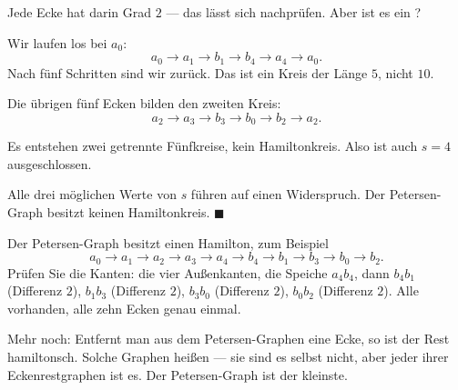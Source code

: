 \begin{merksatz}
Jede Ecke hat darin Grad $2$ --- das lässt sich nachprüfen. Aber ist es ein ?

Wir laufen los bei $a_0$:
\[ a_0 \to a_1 \to b_1 \to b_4 \to a_4 \to a_0 . \]
Nach fünf Schritten sind wir zurück. Das ist ein Kreis der Länge $5$, nicht $10$.

Die übrigen fünf Ecken bilden den zweiten Kreis:
\[ a_2 \to a_3 \to b_3 \to b_0 \to b_2 \to a_2 . \]

\begin{center}
\end{center}

Es entstehen zwei getrennte Fünfkreise, kein Hamiltonkreis. Also ist auch $s = 4$ ausgeschlossen.

Alle drei möglichen Werte von $s$ führen auf einen Widerspruch. Der Petersen-Graph besitzt keinen Hamiltonkreis. $\blacksquare$
\end{merksatz}

\begin{merksatz}
Der Petersen-Graph besitzt einen Hamilton, zum Beispiel
\[ a_0 \to a_1 \to a_2 \to a_3 \to a_4 \to b_4 \to b_1 \to b_3 \to b_0 \to b_2 . \]
Prüfen Sie die Kanten: die vier Außenkanten, die Speiche $a_4b_4$, dann $b_4b_1$ (Differenz $2$), $b_1b_3$ (Differenz $2$), $b_3b_0$ (Differenz $2$), $b_0b_2$ (Differenz $2$). Alle vorhanden, alle zehn Ecken genau einmal. \checkmark

Mehr noch: Entfernt man aus dem Petersen-Graphen eine  Ecke, so ist der Rest hamiltonsch. Solche Graphen heißen  --- sie sind es selbst nicht, aber jeder ihrer Eckenrestgraphen ist es. Der Petersen-Graph ist der kleinste.
\end{merksatz}

